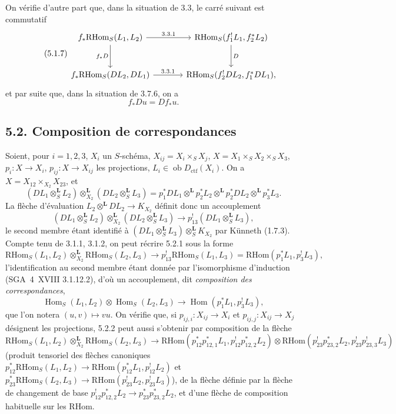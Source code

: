 \documentclass[11pt]{article}
\DeclareMathOperator{\Hom}{Hom}
\providecommand{\RHom}{\mathrm{RHom}}
\providecommand{\RHom}{\mathrm{RHom}}
\providecommand{\Hom}{\operatorname{Hom}}
\providecommand{\RHom}{\mathrm R\mathcal{H}om}
\providecommand{\RHom}{\mathrm{RHom}}
\providecommand{\Hom}{\operatorname{Hom}}
\begin{document}
On vérifie d'autre part que, dans la situation de 3.3, le carré suivant est commutatif
\begin{equation}
\tag{5.1.7}
\begin{tikzcd}[column sep=large,row sep=large]
f_*\RHom_S(L_1,L_2) \arrow[r,"3.3.1"] \arrow[d,"f_*D"']
& \RHom_S(f_1^!L_1,f_2^*L_2) \arrow[d,"D"] \\
f_*\RHom_S(DL_2,DL_1) \arrow[r,"3.3.1"]
& \RHom_S(f_2^!DL_2,f_1^*DL_1),
\end{tikzcd}
\end{equation}
et par suite que, dans la situation de 3.7.6, on a
\begin{equation}
\tag{5.1.8}
f_*Du=Df_*u.
\end{equation}

\subsection*{5.2. Composition de correspondances}

Soient, pour $i=1,2,3$, $X_i$ un $S$-schéma, $X_{ij}=X_i\times_SX_j$, $X=X_1\times_SX_2\times_SX_3$, $p_i:X\to X_i$, $p_{ij}:X\to X_{ij}$ les projections, $L_i\in\operatorname{ob}D_{\mathrm{ctf}}(X_i)$. On a $X=X_{12}\times_{X_2}X_{23}$, et
\[
(DL_1\otimes_S^{\mathbf L}L_2)\otimes_{X_2}^{\mathbf L}(DL_2\otimes_S^{\mathbf L}L_3)
=p_1^*DL_1\otimes^{\mathbf L}p_2^*L_2\otimes^{\mathbf L}p_2^*DL_2\otimes^{\mathbf L}p_3^*L_3.
\]
La flèche d'évaluation $L_2\otimes^{\mathbf L}DL_2\to K_{X_2}$ définit donc un accouplement
\begin{equation}
\tag{5.2.1}
(DL_1\otimes_S^{\mathbf L}L_2)\otimes_{X_2}^{\mathbf L}(DL_2\otimes_S^{\mathbf L}L_3)\longrightarrow p_{13}^!(DL_1\otimes_S^{\mathbf L}L_3),
\end{equation}
le second membre étant identifié à $(DL_1\otimes_S^{\mathbf L}L_3)\otimes_S^{\mathbf L}K_{X_2}$ par Künneth (1.7.3). Compte tenu de 3.1.1, 3.1.2, on peut récrire 5.2.1 sous la forme
\begin{equation}
\tag{5.2.2}
\RHom_S(L_1,L_2)\otimes_{X_2}^{\mathbf L}\RHom_S(L_2,L_3)\longrightarrow p_{13}^!\RHom_S(L_1,L_3)=\RHom(p_1^*L_1,p_3^!L_3),
\end{equation}
l'identification au second membre étant donnée par l'isomorphisme d'induction (SGA~4~XVIII 3.1.12.2), d'où un accouplement, dit \emph{composition des correspondances},
\begin{equation}
\tag{5.2.3}
\Hom_S(L_1,L_2)\otimes\Hom_S(L_2,L_3)\longrightarrow\Hom(p_1^*L_1,p_3^!L_3),
\end{equation}
que l'on notera $(u,v)\mapsto vu$. On vérifie que, si $p_{ij,i}:X_{ij}\to X_i$ et $p_{ij,j}:X_{ij}\to X_j$ désignent les projections, 5.2.2 peut aussi s'obtenir par composition de la flèche
\[
\RHom_S(L_1,L_2)\otimes_{X_2}^{\mathbf L}\RHom_S(L_2,L_3)
\longrightarrow
\RHom(p_{12}^*p_{12,1}^*L_1,p_{12}^!p_{12,2}^*L_2)
\otimes
\RHom(p_{23}^!p_{23,2}^*L_2,p_{23}^!p_{23,3}^!L_3)
\]
(produit tensoriel des flèches canoniques $p_{12}^*\RHom_S(L_1,L_2)\to\RHom(p_{12}^*L_1,p_{12}^!L_2)$ et $p_{23}^*\RHom_S(L_2,L_3)\to\RHom(p_{23}^!L_2,p_{23}^!L_3)$), de la flèche définie par la flèche de changement de base $p_{12}^!p_{12,2}^*L_2\to p_{23}^*p_{23,2}^*L_2$, et d'une flèche de composition habituelle sur les $\RHom$.
\end{document}
